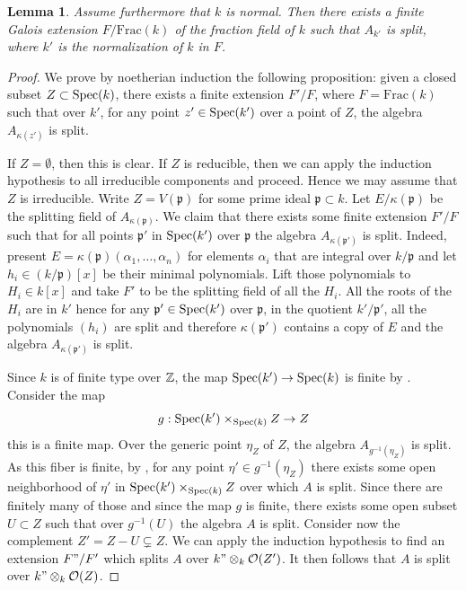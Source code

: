 \documentclass[a4paper, 10pt, oneside, reqno]{amsart}
\theoremstyle{plain}
\newtheorem{lem}[thm]{Lemma}
\theoremstyle{definition}
\theoremstyle{remark}
\newcommand{\Frac}{\mathrm{Frac}}
\newcommand{\pfrak}{\mathfrak{p}}
\begin{document}
\begin{lem}\label{lem:generic-splitting}
Assume furthermore that $k$ is normal. Then there exists a finite Galois extension $F/\Frac(k)$ of the fraction field of $k$ such that $A_{k'}$ is split, where $k'$ is the normalization of $k$ in $F$.
\end{lem}

\begin{proof}
We prove by noetherian induction the following proposition: given a closed subset $Z \subset \mathrm{Spec}(k)$, there exists a finite extension $F'/F$, where $F = \Frac(k)$ such that over $k'$, for any point $z' \in \mathrm{Spec}(k')$ over a point of $Z$, the algebra $A_{\kappa(z')}$ is split. 

If $Z = \emptyset$, then this is clear. If $Z$ is reducible, then we can apply the induction hypothesis to all irreducible components and proceed. Hence we may assume that $Z$ is irreducible. Write $Z = V(\pfrak)$ for some prime ideal $\pfrak \subset k$. Let $E/\kappa(\pfrak)$ be the splitting field of $A_{\kappa(\pfrak)}$. We claim that there exists some finite extension $F'/F$ such that for all points $\pfrak'$ in $\mathrm{Spec}(k')$ over $\pfrak$ the algebra $A_{\kappa(\pfrak')}$ is split. Indeed, present $E = \kappa(\pfrak)(\alpha_1,\dots, \alpha_n)$ for elements $\alpha_i$ that are integral over $k/\pfrak$ and let $h_i \in (k/\pfrak)[x]$ be their minimal polynomials. Lift those polynomials to $H_i \in k[x]$ and take $F'$ to be the splitting field of all the $H_i$. All the roots of the $H_i$ are in $k'$ hence for any $\pfrak' \in \Spec(k')$ over $\pfrak$, in the quotient $k'/\pfrak'$, all the polynomials $(h_i)$ are split and therefore $\kappa(\pfrak')$ contains a copy of $E$ and the algebra $A_{\kappa(\pfrak')}$ is split. 

Since $k$ is of finite type over $\mathbb{Z}$, the map $\mathrm{Spec}(k') \to \mathrm{Spec}(k)$ is finite by \cite[Tag 035B]{StacksProject}. Consider the map 
$$g : \mathrm{Spec}(k') \times_{\mathrm{Spec}(k)} Z \to Z$$ 
this is a finite map. Over the generic point $\eta_Z$ of $Z$, the algebra $A_{g^{-1}(\eta_Z)}$ is split. As this fiber is finite, by \cite[Theorem 4.6]{ThielDecompMatrices}, for any point $\eta' \in g^{-1}(\eta_Z)$ there exists some open neighborhood of $\eta'$ in $\mathrm{Spec}(k') \times_{\mathrm{Spec}(k)} Z$ over which $A$ is split. Since there are finitely many of those and since the map $g$ is finite, there exists some open subset $U\subset Z$ such that over $g^{-1}(U)$ the algebra $A$ is split. Consider now the complement $Z' = Z-U \subsetneq Z$. We can apply the induction hypothesis to find an extension $F"/F'$ which splits $A$ over $k" \otimes_k \mathcal{O}(Z')$. It then follows that $A$ is split over $k" \otimes_k \mathcal{O}(Z)$.



\end{proof}
\end{document}
